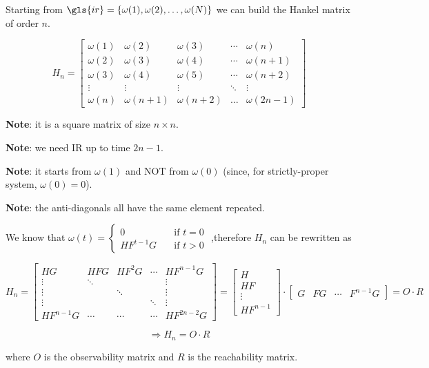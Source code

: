 \begin{definition}
    Starting from $\gls{ir} = \{\omega(1), \omega(2), \ldots, \omega(N)\}$ we can build the Hankel matrix of order $n$.

\[
    H_n = \begin{bmatrix}
        \omega(1) & \omega(2) & \omega(3) & \cdots & \omega(n) \\
        \omega(2) & \omega(3) & \omega(4) & \cdots & \omega(n+1) \\
        \omega(3) & \omega(4) & \omega(5) & \cdots & \omega(n+2) \\
        \vdots    & \vdots    & \vdots    & \ddots & \vdots \\
        \omega(n) & \omega(n+1) & \omega(n+2) & \ldots & \omega(2n-1)
    \end{bmatrix}
\]

    \textbf{Note}: it is a square matrix of size $n\times n$.

    \textbf{Note}: we need IR up to time $2n-1$.

    \textbf{Note}: it starts from $\omega(1)$ and NOT from $\omega(0)$ (since, for strictly-proper system, $\omega(0)=0$).

    \textbf{Note}: the anti-diagonals all have the same element repeated.
    
    We know that $\omega(t) = \begin{cases}
    0 &\quad \text{if } t = 0 \\
    HF^{t-1}G &\quad \text{if } t > 0
    \end{cases}$ ,\qquad therefore $H_n$ can be rewritten as

    \[
        H_n = \begin{bmatrix}
            HG     & HFG    & HF^2G  & \cdots & HF^{n-1}G \\
            \vdots & \ddots &        &        & \vdots \\
            \vdots &        & \ddots &        & \vdots \\
            \vdots &        &        & \ddots & \vdots \\
            HF^{n-1}G & \cdots & \cdots & \cdots & HF^{2n-2}G
        \end{bmatrix} = \begin{bmatrix}
            H \\
            HF \\
            \vdots \\
            HF^{n-1}
        \end{bmatrix} \cdot \begin{bmatrix}
            G & FG & \cdots & F^{n-1}G
        \end{bmatrix} = O \cdot R
    \]
    
    \[
        \Rightarrow H_n = O \cdot R
    \]
    
    where $O$ is the observability matrix and $R$ is the reachability matrix.
\end{definition}




